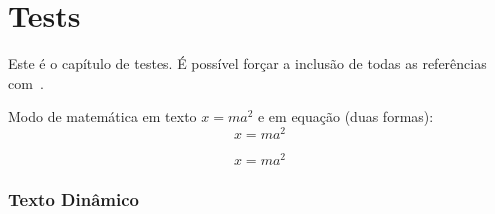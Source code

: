 \chapter{Tests}\label{ch:tests}

Este é o capítulo de testes.
É possível forçar a inclusão de todas as referências com~\cite{*}.

Modo de matemática em texto $x = ma^2$ e em equação (duas formas):
\[
    x = ma^2
\]

\begin{equation}
    x = ma^2\label{eq:equation}
\end{equation}

\subsection{Texto Dinâmico}\label{subsec:texto-dinamico}

